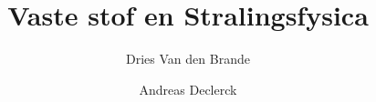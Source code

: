 \usepackage[dutch]{babel}
\usepackage{amsmath}

\title{Vaste stof en Stralingsfysica}
\author{Dries Van den Brande \and Andreas Declerck}
